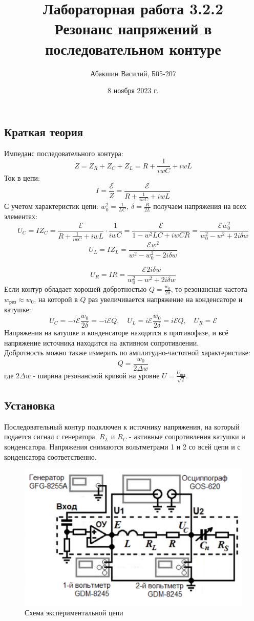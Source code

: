 \documentclass[a4paper, 12pt]{article}
\title{Лабораторная работа 3.2.2 \\ Резонанс напряжений в последовательном контуре}
\author{Абакшин Василий, Б05-207}
\date{8 ноября 2023 г.}
\newcommand{\E}{\mathcal{E}}
\begin{document}
	\maketitle
	\subsection*{Краткая теория}
	Импеданс последовательного контура:
	\[Z = Z_R + Z_C + Z_L = R + \frac{1}{iwC} + iwL\]
	Ток в цепи:
	\[I = \frac{\E}{Z} = \frac{\E}{R + \frac{1}{iwC} + iwL}\]
	С учетом характеристик цепи: $w_0^2 = \frac{1}{LC}, \ \delta = \frac{R}{2L}$ получаем напряжения на всех элементах:
	\[U_C = IZ_C = \frac{\E}{R + \frac{1}{iwC} + iwL} \cdot \frac{1}{iwC} = \frac{\E}{1 - w^2LC + iwCR} = \frac{\E w_0^2}{w_0^2 - w^2 + 2i\delta w}\]
	\[U_L = IZ_L = \frac{\E w^2}{w^2 - w_0^2 - 2i\delta w}\]
	
	\[U_R = IR = \frac{\E 2i\delta w}{w_0^2 - w^2 + 2i\delta w}\]
	Если контур обладает хорошей добротностью $Q = \frac{w_0}{2\delta}$, то резонансная частота $w_\text{рез} \approx w_0$, на которой в $Q$ раз увеличивается напряжение на конденсаторе и катушке:
	\[U_C = -i\E \frac{w_0}{2\delta} = -i\E Q, \quad U_L = i\E \frac{w_0}{2\delta} = i\E Q, \quad U_R = \E \]
	Напряжения на катушке и конденсаторе находятся в противофазе, и всё напряжение источника находится на активном сопротивлении.\\
	Добротность можно также измерить по амплитудно-частотной характеристике: \[Q = \frac{w_0}{2\Delta w}\] где $2\Delta w$ - ширина резонансной кривой на уровне $U = \frac{U_{\text{рез}}}{\sqrt{2}}$.
	
	\subsection*{Установка}
	Последовательный контур подключен к источнику напряжения, на который подается сигнал с генератора.
	$R_L$ и $R_C$ - активные сопротивления катушки и конденсатора. Напряжения снимаются вольтметрами 1 и 2 со всей цепи и с конденсатора соответственно.
	\begin{figure}[h!]
		\centering
		\includegraphics[width = \textwidth]{Цепь}
		\caption{Схема экспериментальной цепи}
	\end{figure}
	\newpage
\end{document}
